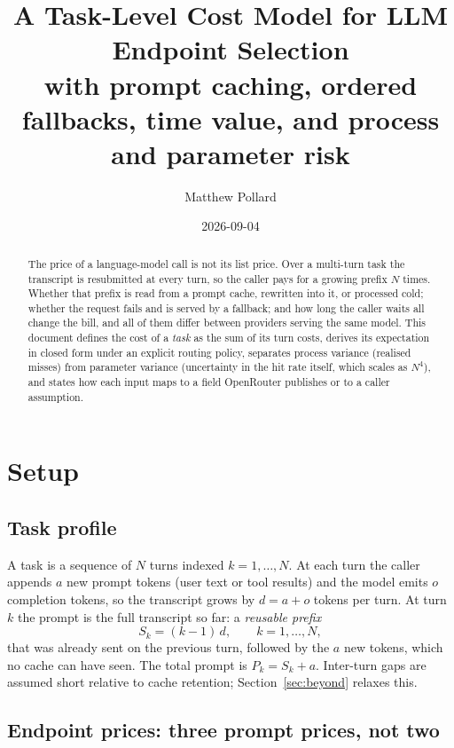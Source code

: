 \documentclass[11pt]{article}
\title{A Task-Level Cost Model for LLM Endpoint Selection\\
\large with prompt caching, ordered fallbacks, time value, and process and parameter risk}
\author{Matthew Pollard}
\date{2026-09-04}
\begin{document}
\maketitle

\begin{abstract}
The price of a language-model call is not its list price. Over a multi-turn task
the transcript is resubmitted at every turn, so the caller pays for a growing
prefix $N$ times. Whether that prefix is read from a prompt cache, rewritten into
it, or processed cold; whether the request fails and is served by a fallback; and
how long the caller waits all change the bill, and all of them differ between
providers serving the same model. This document defines the cost of a
\emph{task} as the sum of its turn costs, derives its expectation in closed form
under an explicit routing policy, separates process variance (realised misses)
from parameter variance (uncertainty in the hit rate itself, which scales as
$N^4$), and states how each input maps to a field OpenRouter publishes or to a
caller assumption.
\end{abstract}

\section{Setup}

\subsection{Task profile}

A task is a sequence of $N$ turns indexed $k = 1, \dots, N$. At each turn the
caller appends $a$ new prompt tokens (user text or tool results) and the model
emits $o$ completion tokens, so the transcript grows by $d = a + o$ tokens per
turn. At turn $k$ the prompt is the full transcript so far: a \emph{reusable
prefix}
\[
  S_k = (k-1)\,d, \qquad k = 1,\dots,N,
\]
that was already sent on the previous turn, followed by the $a$ new tokens,
which no cache can have seen. The total prompt is $P_k = S_k + a$. Inter-turn
gaps are assumed short relative to cache retention; Section~\ref{sec:beyond}
relaxes this.

\subsection{Endpoint prices: three prompt prices, not two}\label{sec:prices}
\end{document}
